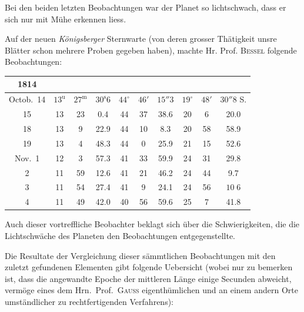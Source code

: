\par\indent Bei den beiden letzten Beobachtungen war der Planet so lichtschwach, dass er sich nur mit
Mühe erkennen liess.

\par\indent Auf der neuen \emph{Königsberger} Sternwarte (von deren grosser Thätigkeit unsre Blätter
schon mehrere Proben gegeben haben), machte Hr. Prof. \textsc{Bessel} folgende
Beobachtungen:

\begin{center}\fontsize{9}{11}\selectfont\setlength{\tabcolsep}{3pt}\renewcommand{\arraystretch}{1.15}\begin{tabular}{c|ccc|ccc|ccc}
1814 &  &  &  \\
\hline
Octob.\ 14 & $13^{\mathrm u}$ & $27^{\mathrm m}$ & $30^{\mathrm s}6$ & $44^{\circ}$ & $46'$ & $15''3$ & $19^{\circ}$ & $48'$ & $30''8$ S. \\
15         & 13 & 23 & 0.4  & 44 & 37 & 38.6 & 20 & 6  & 20.0 \\
18         & 13 & 9  & 22.9 & 44 & 10 & 8.3  & 20 & 58 & 58.9 \\
19         & 13 & 4  & 48.3 & 44 & 0  & 25.9 & 21 & 15 & 52.6 \\
Nov.\ 1    & 12 & 3  & 57.3 & 41 & 33 & 59.9 & 24 & 31 & 29.8 \\
2          & 11 & 59 & 12.6 & 41 & 21 & 46.2 & 24 & 44 & 9.7  \\
3          & 11 & 54 & 27.4 & 41 & 9  & 24.1 & 24 & 56 & $10\;6$ \\
4          & 11 & 49 & 42.0 & 40 & 56 & 59.6 & 25 & 7  & 41.8 \\
\end{tabular}\end{center}

\par\indent Auch dieser vortreffliche Beobachter beklagt sich über die Schwierigkeiten, die die Lichtschwäche des Planeten den Beobachtungen entgegenstellte.

\par\indent Die Resultate der Vergleichung dieser sämmtlichen Beobachtungen mit den zuletzt gefundenen Elementen gibt folgende Uebersicht (wobei nur zu bemerken ist, dass die angewandte Epoche der mittleren Länge einige Secunden abweicht, vermöge eines dem Hrn.\ Prof.\ \textsc{Gauss} eigenthümlichen und an einem andern Orte umständlicher zu rechtfertigenden Verfahrens):

